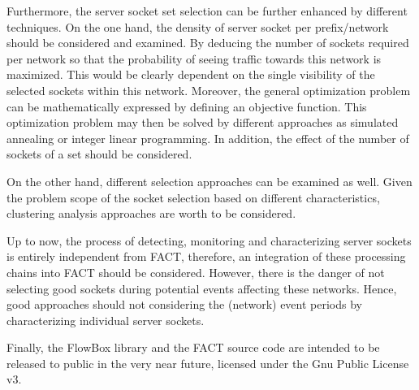 Furthermore, the server socket set selection can be further enhanced by 
different techniques. On the one hand, the density of server socket per 
prefix/network should be considered and examined. By deducing the number of 
sockets required per network so that the probability of seeing traffic towards 
this network is maximized. This would be clearly dependent on the single 
visibility of the selected sockets within this network. Moreover, the general 
optimization problem can be mathematically expressed by defining an objective 
function. This optimization problem may then be solved by different approaches 
as simulated annealing or integer linear programming. In addition, the effect of 
the number of sockets of a set should be considered. 

On the other hand, different selection approaches can be examined as well. Given 
the problem scope of the socket selection based on different characteristics, 
clustering analysis approaches are worth to be considered. 

Up to now, the process of detecting, monitoring and characterizing server sockets is entirely independent from FACT, therefore, an integration of these processing chains into FACT should be considered. However, there is the danger of not selecting good sockets during potential events affecting these networks. Hence, good approaches should not considering the (network) event periods by characterizing individual server sockets.

Finally, the FlowBox library and the FACT source code are intended to be released to public in the very near future, licensed under the Gnu Public License v3. 